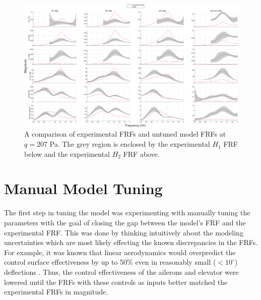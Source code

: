 \begin{landscape}

\begin{figure}[H]
	\centering
	\label{fig:noTuneFRF}
	\includegraphics[width=9in]{figs/FRFcompare_noTune_q207.png}
	\caption{A comparison of experimental FRFs and untuned model FRFs at $q=207$ Pa. The grey region is enclosed by the experimental $H_1$ FRF below and the experimental $H_2$ FRF above.}
\end{figure}

\end{landscape}

\section{Manual Model Tuning} %

The first step in tuning the model was experimenting with manually tuning the parameters with the goal of closing the gap between the model's FRF and the experimental FRF. This was done by thinking intuitively about the modeling uncertainties which are most likely effecting the known discrepancies in the FRFs. For example, it was known that linear aerodynamics would overpredict the control surface effectiveness by up to 50\% even in reasonably small ($<10^\circ$) deflections \cite{Young1947,Riebe1955}. Thus, the control effectiveness of the ailerons and elevator were lowered until the FRFs with these controls as inputs better matched the experimental FRFs in magnitude.

